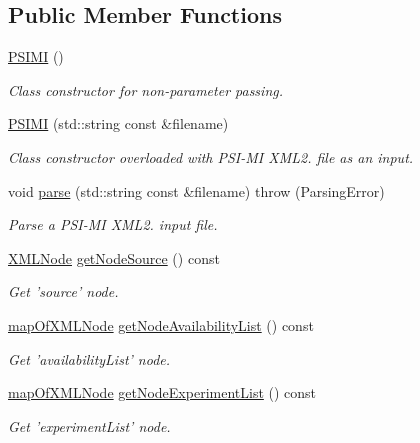\subsection*{Public Member Functions}
\begin{DoxyCompactItemize}
\item 
\hyperlink{classunisys_1_1PSIMI_a6497808571f79e5a57c072bbc6b5a185}{P\-S\-I\-M\-I} ()
\begin{DoxyCompactList}\small\item\em Class constructor for non-\/parameter passing. \end{DoxyCompactList}\item 
\hyperlink{classunisys_1_1PSIMI_a5db191aaa5b9e170c62b572688bcc356}{P\-S\-I\-M\-I} (std\-::string const \&filename)
\begin{DoxyCompactList}\small\item\em Class constructor overloaded with P\-S\-I-\/\-M\-I X\-M\-L2. file as an input. \end{DoxyCompactList}\item 
void \hyperlink{classunisys_1_1PSIMI_ac8af54bbfd8a79229c2129dfb262639f}{parse} (std\-::string const \&filename)  throw (\-Parsing\-Error)
\begin{DoxyCompactList}\small\item\em Parse a P\-S\-I-\/\-M\-I X\-M\-L2. input file. \end{DoxyCompactList}\item 
\hyperlink{structXMLNode}{X\-M\-L\-Node} \hyperlink{classunisys_1_1PSIMI_ad6ff25bf694abebf7fe847953c36b3b5}{get\-Node\-Source} () const 
\begin{DoxyCompactList}\small\item\em Get 'source' node. \end{DoxyCompactList}\item 
\hyperlink{classunisys_1_1PSIMI_a0cc51198d3cd685cfa21a42c5dc0ee7f}{map\-Of\-X\-M\-L\-Node} \hyperlink{classunisys_1_1PSIMI_afee1135476d1b1703ce5a8bcace75c55}{get\-Node\-Availability\-List} () const 
\begin{DoxyCompactList}\small\item\em Get 'availability\-List' node. \end{DoxyCompactList}\item 
\hyperlink{classunisys_1_1PSIMI_a0cc51198d3cd685cfa21a42c5dc0ee7f}{map\-Of\-X\-M\-L\-Node} \hyperlink{classunisys_1_1PSIMI_af3cdcfffd869026bbe81cd81f20d5484}{get\-Node\-Experiment\-List} () const 
\begin{DoxyCompactList}\small\item\em Get 'experiment\-List' node. \end{DoxyCompactList}\item 

\end{DoxyCompactItemize}

